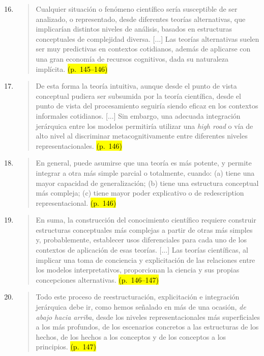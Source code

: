 \documentclass{article}
\begin{document}
\begin{enumerate}
  \setcounter{enumi}{15}

  \item 
  \begin{quote}
  Cualquier situación o fenómeno científico sería susceptible de ser analizado, o representado, desde diferentes teorías alternativas, que implicarían distintos niveles de análisis, basados en estructuras conceptuales de complejidad diversa. [...] Las teorías alternativas suelen ser muy predictivas en contextos cotidianos, además de aplicarse con una gran economía de recursos cognitivos, dada su naturaleza implícita. \hl{(p.~145–146)}
  \end{quote}

  \item
  \begin{quote}
  De esta forma la teoría intuitiva, aunque desde el punto de vista conceptual pudiera ser subsumida por la teoría científica, desde el punto de vista del procesamiento seguiría siendo eficaz en los contextos informales cotidianos. [...] Sin embargo, una adecuada integración jerárquica entre los modelos permitiría utilizar una \textit{high road} o vía de alto nivel al discriminar metacognitivamente entre diferentes niveles representacionales. \hl{(p.~146)}
  \end{quote}

  \item
  \begin{quote}
  En general, puede asumirse que una teoría es más potente, y permite integrar a otra más simple parcial o totalmente, cuando: (a) tiene una mayor capacidad de generalización; (b) tiene una estructura conceptual más compleja; (c) tiene mayor poder explicativo o de redescription representacional. \hl{(p.~146)}
  \end{quote}

  \item
  \begin{quote}
  En suma, la construcción del conocimiento científico requiere construir estructuras conceptuales más complejas a partir de otras más simples y, probablemente, establecer usos diferenciales para cada uno de los contextos de aplicación de esas teorías. [...] Las teorías científicas, al implicar una toma de conciencia y explicitación de las relaciones entre los modelos interpretativos, proporcionan la ciencia y sus propias concepciones alternativas. \hl{(p.~146–147)}
  \end{quote}

  \item
  \begin{quote}
  Todo este proceso de reestructuración, explicitación e integración jerárquica debe ir, como hemos señalado en más de una ocasión, \textit{de abajo hacia arriba}, desde los niveles representacionales más superficiales a los más profundos, de los escenarios concretos a las estructuras de los hechos, de los hechos a los conceptos y de los conceptos a los principios. \hl{(p.~147)}
  \end{quote}
\end{enumerate}
\end{document}
